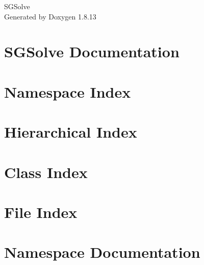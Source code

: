 \documentclass[twoside]{book}
\newcommand{\+}{\discretionary{\mbox{\scriptsize$\hookleftarrow$}}{}{}}
\newcommand{\clearemptydoublepage}{%
  \newpage{\pagestyle{empty}\cleardoublepage}%
}
\begin{document}
\hypersetup{pageanchor=false,
             bookmarksnumbered=true,
             pdfencoding=unicode
            }
\begin{titlepage}
\vspace*{7cm}
\begin{center}%
{\Large S\+G\+Solve }\\
\vspace*{1cm}
{\large Generated by Doxygen 1.8.13}\\
\end{center}
\end{titlepage}
\clearemptydoublepage
{}
\tableofcontents
\clearemptydoublepage
{}
\hypersetup{pageanchor=true}

\chapter{S\+G\+Solve Documentation}
\label{index}\hypertarget{index}{}
\chapter{Namespace Index}

\chapter{Hierarchical Index}

\chapter{Class Index}

\chapter{File Index}

\chapter{Namespace Documentation}

\end{document}
